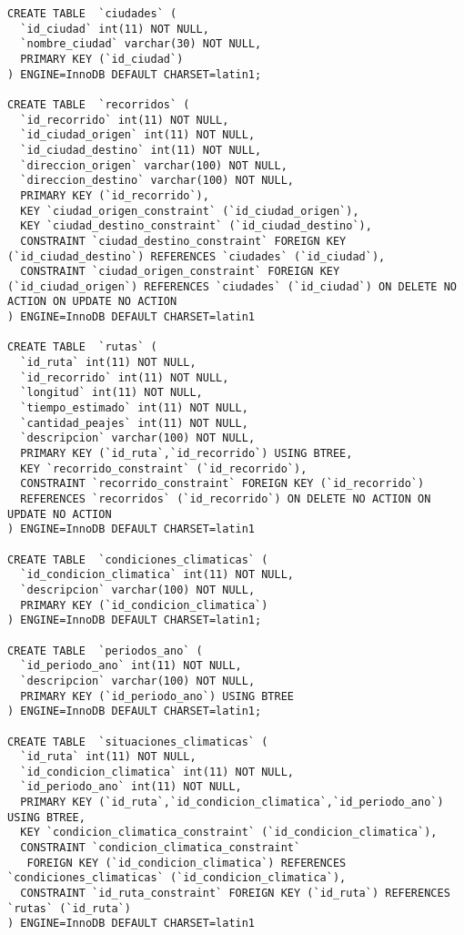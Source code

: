 \begin{verbatim}
CREATE TABLE  `ciudades` (
  `id_ciudad` int(11) NOT NULL,
  `nombre_ciudad` varchar(30) NOT NULL,
  PRIMARY KEY (`id_ciudad`)
) ENGINE=InnoDB DEFAULT CHARSET=latin1;

CREATE TABLE  `recorridos` (
  `id_recorrido` int(11) NOT NULL,
  `id_ciudad_origen` int(11) NOT NULL,
  `id_ciudad_destino` int(11) NOT NULL,
  `direccion_origen` varchar(100) NOT NULL,
  `direccion_destino` varchar(100) NOT NULL,
  PRIMARY KEY (`id_recorrido`),
  KEY `ciudad_origen_constraint` (`id_ciudad_origen`),
  KEY `ciudad_destino_constraint` (`id_ciudad_destino`),
  CONSTRAINT `ciudad_destino_constraint` FOREIGN KEY (`id_ciudad_destino`) REFERENCES `ciudades` (`id_ciudad`),
  CONSTRAINT `ciudad_origen_constraint` FOREIGN KEY (`id_ciudad_origen`) REFERENCES `ciudades` (`id_ciudad`) ON DELETE NO ACTION ON UPDATE NO ACTION
) ENGINE=InnoDB DEFAULT CHARSET=latin1

CREATE TABLE  `rutas` (
  `id_ruta` int(11) NOT NULL,
  `id_recorrido` int(11) NOT NULL,
  `longitud` int(11) NOT NULL,
  `tiempo_estimado` int(11) NOT NULL,
  `cantidad_peajes` int(11) NOT NULL,
  `descripcion` varchar(100) NOT NULL,
  PRIMARY KEY (`id_ruta`,`id_recorrido`) USING BTREE,
  KEY `recorrido_constraint` (`id_recorrido`),
  CONSTRAINT `recorrido_constraint` FOREIGN KEY (`id_recorrido`) 
  REFERENCES `recorridos` (`id_recorrido`) ON DELETE NO ACTION ON UPDATE NO ACTION
) ENGINE=InnoDB DEFAULT CHARSET=latin1

CREATE TABLE  `condiciones_climaticas` (
  `id_condicion_climatica` int(11) NOT NULL,
  `descripcion` varchar(100) NOT NULL,
  PRIMARY KEY (`id_condicion_climatica`)
) ENGINE=InnoDB DEFAULT CHARSET=latin1;

CREATE TABLE  `periodos_ano` (
  `id_periodo_ano` int(11) NOT NULL,
  `descripcion` varchar(100) NOT NULL,
  PRIMARY KEY (`id_periodo_ano`) USING BTREE
) ENGINE=InnoDB DEFAULT CHARSET=latin1;

CREATE TABLE  `situaciones_climaticas` (
  `id_ruta` int(11) NOT NULL,
  `id_condicion_climatica` int(11) NOT NULL,
  `id_periodo_ano` int(11) NOT NULL,
  PRIMARY KEY (`id_ruta`,`id_condicion_climatica`,`id_periodo_ano`) USING BTREE,
  KEY `condicion_climatica_constraint` (`id_condicion_climatica`),
  CONSTRAINT `condicion_climatica_constraint`
   FOREIGN KEY (`id_condicion_climatica`) REFERENCES `condiciones_climaticas` (`id_condicion_climatica`),
  CONSTRAINT `id_ruta_constraint` FOREIGN KEY (`id_ruta`) REFERENCES `rutas` (`id_ruta`)
) ENGINE=InnoDB DEFAULT CHARSET=latin1
\end{verbatim}

